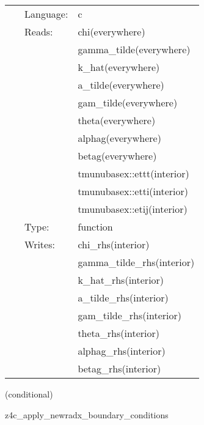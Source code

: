  \begin{tabular*}{160mm}{cll} 
~ & Language:  & c \\ 
~ & Reads:  & chi(everywhere) \\ 
~& ~ &gamma\_tilde(everywhere)\\ 
~& ~ &k\_hat(everywhere)\\ 
~& ~ &a\_tilde(everywhere)\\ 
~& ~ &gam\_tilde(everywhere)\\ 
~& ~ &theta(everywhere)\\ 
~& ~ &alphag(everywhere)\\ 
~& ~ &betag(everywhere)\\ 
~& ~ &tmunubasex::ettt(interior)\\ 
~& ~ &tmunubasex::etti(interior)\\ 
~& ~ &tmunubasex::etij(interior)\\ 
~ & Type:  & function \\ 
~ & Writes:  & chi\_rhs(interior) \\ 
~& ~ &gamma\_tilde\_rhs(interior)\\ 
~& ~ &k\_hat\_rhs(interior)\\ 
~& ~ &a\_tilde\_rhs(interior)\\ 
~& ~ &gam\_tilde\_rhs(interior)\\ 
~& ~ &theta\_rhs(interior)\\ 
~& ~ &alphag\_rhs(interior)\\ 
~& ~ &betag\_rhs(interior)\\ 
\end{tabular*} 


\vspace{5mm}

   (conditional) 

\hspace{5mm} z4c\_apply\_newradx\_boundary\_conditions 

\hspace{5mm}{\it apply radiative boundary conditions to z4c rhs variables using newradx } 


\hspace{5mm}

